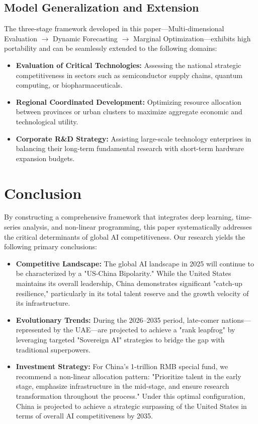 \documentclass[12pt]{article}
\begin{document}
	\subsection{Model Generalization and Extension}
	The three-stage framework developed in this paper—Multi-dimensional Evaluation $\rightarrow$ Dynamic Forecasting $\rightarrow$ Marginal Optimization—exhibits high portability and can be seamlessly extended to the following domains:
	\begin{itemize}
		\item \textbf{Evaluation of Critical Technologies:} Assessing the national strategic competitiveness in sectors such as semiconductor supply chains, quantum computing, or biopharmaceuticals.
		\item \textbf{Regional Coordinated Development:} Optimizing resource allocation between provinces or urban clusters to maximize aggregate economic and technological utility.
		\item \textbf{Corporate R\&D Strategy:} Assisting large-scale technology enterprises in balancing their long-term fundamental research with short-term hardware expansion budgets.
	\end{itemize}
	
	\section{Conclusion}
	By constructing a comprehensive framework that integrates deep learning, time-series analysis, and non-linear programming, this paper systematically addresses the critical determinants of global AI competitiveness. Our research yields the following primary conclusions:
	\begin{itemize}
		\item \textbf{Competitive Landscape:} The global AI landscape in 2025 will continue to be characterized by a "US-China Bipolarity." While the United States maintains its overall leadership, China demonstrates significant "catch-up resilience," particularly in its total talent reserve and the growth velocity of its infrastructure.
		\item \textbf{Evolutionary Trends:} During the 2026–2035 period, late-comer nations—represented by the UAE—are projected to achieve a "rank leapfrog" by leveraging targeted "Sovereign AI" strategies to bridge the gap with traditional superpowers.
		\item \textbf{Investment Strategy:} For China's 1-trillion RMB special fund, we recommend a non-linear allocation pattern: "Prioritize talent in the early stage, emphasize infrastructure in the mid-stage, and ensure research transformation throughout the process." Under this optimal configuration, China is projected to achieve a strategic surpassing of the United States in terms of overall AI competitiveness by 2035.
	\end{itemize}
	
\end{document}
